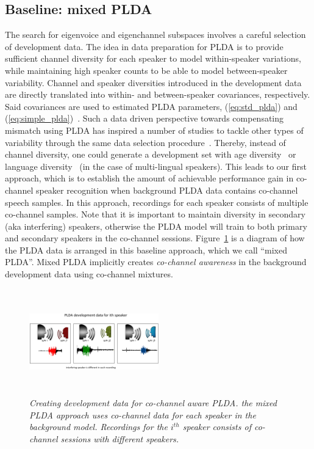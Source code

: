 \documentclass[journal]{IEEEtran}
\begin{document}
\subsection{Baseline: mixed PLDA}
\label{ssec:plda_data_prep}
The search for eigenvoice and eigenchannel subspaces involves a careful selection of development data. 
The idea in data preparation for PLDA is to provide sufficient channel diversity for each speaker to model within-speaker variations, while maintaining high speaker counts to be able to model between-speaker variability. 
Channel and speaker diversities introduced in the development data are directly translated into within- and between-speaker covariances, respectively. Said covariances are used to estimated PLDA parameters, (\ref{eq:std_plda}) and (\ref{eq:simple_plda})~\cite{brummer_twocovariance}. 
Such a data driven perspective towards compensating mismatch using PLDA has inspired a number of studies to tackle other types of variability through the same data selection procedure~\cite{misra2014languagemismatch}. 
Thereby, instead of channel diversity, one could generate a development set with age diversity~\cite{finnian} or language diversity~\cite{misra2014languagemismatch} (in the case of multi-lingual speakers). 
This leads to our first approach, which is to establish the amount of achievable performance gain in co-channel speaker recognition when background PLDA data contains co-channel speech samples. 
In this approach, recordings for each speaker consists of multiple co-channel samples. 
Note that it is important to maintain diversity in secondary (aka interfering) speakers, otherwise the PLDA model will train to both primary and secondary speakers in the co-channel sessions. 
Figure~\ref{fig:mixedPLDA_diagram} is a diagram of how the PLDA data is arranged in this baseline approach, which we call ``mixed PLDA''. 
Mixed PLDA implicitly creates {\it co-channel awareness} in the background development data using co-channel mixtures. 


\begin{figure}[t!]
	\centering
	\vspace{0mm}
	\includegraphics[width=0.5\textwidth, height=1.8in]{figures/mixedPLDA_slide-crop}
  	\vspace{-5mm}
	\caption{\it \small Creating development data for co-channel aware PLDA. the mixed PLDA approach uses co-channel data for each speaker in the background model. Recordings for the $i^{th}$ speaker consists of co-channel sessions with different speakers.}
	\label{fig:mixedPLDA_diagram}
	\vspace{-3mm}
\end{figure}
\end{document}
